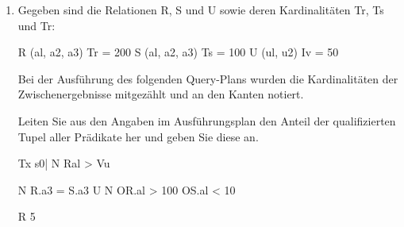 \documentclass{bschlangaul-aufgabe}
\begin{document}
\begin{enumerate}

\item Gegeben sind die Relationen R, S und U sowie deren Kardinalitäten
Tr, Ts und Tr:

R (al, a2, a3) Tr = 200
S (al, a2, a3) Ts = 100
U (ul, u2) Iv = 50

Bei der Ausführung des folgenden Query-Plans wurden die Kardinalitäten
der Zwischenergebnisse mitgezählt und an den Kanten notiert.

Leiten Sie aus den Angaben im Ausführungsplan den Anteil der
qualifizierten Tupel aller Prädikate her und geben Sie diese an.

Tx
s0|
N Ral > Vu

N R.a3 = S.a3 U
 N
OR.al > 100 OS.al < 10

R 5
\end{enumerate}
\end{document}

